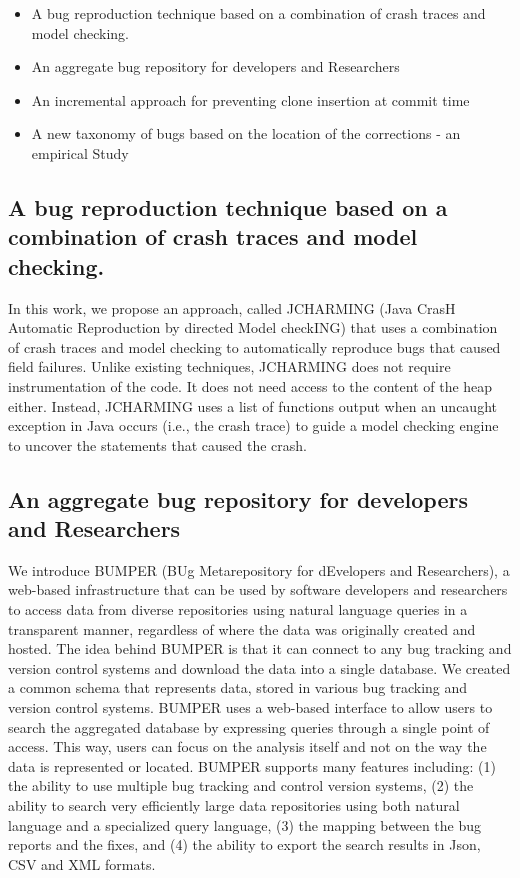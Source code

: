 \begin{itemize}
	\item A bug reproduction technique based on a combination of crash traces and model checking.
    \item An aggregate bug  repository for  developers  and  Researchers
	\item An incremental approach for preventing clone insertion at commit time
	\item A new taxonomy of bugs based on the location of the corrections - an empirical Study
\end{itemize}

\subsection{A bug reproduction technique based on a combination of crash traces and model checking.}

In this work, we propose an approach, called JCHARMING (Java CrasH Automatic Reproduction by directed Model checkING) that uses a combination of crash traces and model checking to automatically reproduce bugs that caused field failures. Unlike existing techniques, JCHARMING does not require instrumentation of the code. It does not need access to the content of the heap either. Instead, JCHARMING uses a list of functions output when an uncaught exception in Java occurs (i.e., the crash trace) to guide a model checking engine to uncover the statements that caused the crash. 

\subsection{An aggregate bug  repository for  developers  and  Researchers}
We introduce BUMPER (BUg Metarepository for  dEvelopers  and  Researchers),  a  web-based  infrastructure
that  can  be  used  by  software  developers  and  researchers  to access  data  from  diverse  repositories  using  natural  language queries in a transparent manner, regardless of where the data was originally created and hosted. The  idea  behind  BUMPER  is  that  it  can  connect  to  any bug  tracking  and  version  control  systems  and  download  the data  into  a  single  database.  We  created  a  common  schema that represents data, stored in various bug tracking and version control systems. BUMPER uses a web-based interface to allow users to search the aggregated database by expressing queries through a single point of access. This way, users can focus on the analysis itself and not on the way the data is represented or located. BUMPER supports many features including: (1) the ability to use multiple bug tracking and control version systems, (2) the  ability  to  search  very  efficiently  large  data  repositories using both natural language and a specialized query language, (3)  the  mapping  between  the  bug  reports  and  the  fixes,  and (4)  the  ability  to  export  the  search  results  in  Json,  CSV  and XML formats.

